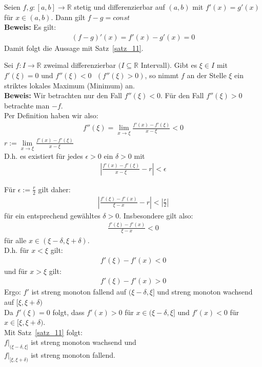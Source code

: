\begin{Korollar}{
	Seien $f,g : [a,b] \rightarrow \mathbb{R}$ stetig und differenzierbar auf
	$(a,b)$ mit $f'(x) = g'(x)$ für $x \in (a,b)$. Dann gilt $f-g = const$\\
	\textbf{Beweis:} Es gilt: 
	\begin{align*}
		(f-g)'(x) = f'(x)-g'(x) = 0
	\end{align*}
	Damit folgt die Aussage mit Satz~\ref{satz_11}.
}\end{Korollar}

\begin{Satz}{
	Sei $f: I \rightarrow \mathbb{R}$ zweimal differenzierbar $(I \subseteq 
	\mathbb{R}$ Intervall$)$. Gibt es $\xi \in I$ mit $f'(\xi) = 0$ und 
	$f''(\xi) < 0 \textbf{ }  (f''(\xi)> 0)$, so nimmt $f$ an der Stelle $\xi$ ein 
	striktes lokales Maximum (Minimum) an.\\
	\textbf{Beweis:} Wir betrachten nur den Fall $f''(\xi) < 0$. Für den Fall
	$f''(\xi) > 0$ betrachte man $-f$.\\
	Per Definition haben wir also: 
	\begin{align*}
		f''(\xi) = \lim\limits_{x \rightarrow \xi}{\frac{f'(x) - f'(\xi)}{x - \xi} }
		< 0
	\end{align*}
	$r := \lim\limits_{x \rightarrow \xi}{\frac{f'(x) - f'(\xi)}{x - \xi} } $ \\
	D.h. es existiert für jedes $ \epsilon > 0$ ein $\delta > 0$ mit
	\begin{align*}
		\left\vert \frac{f'(x) - f'(\xi)}{x - \xi} - r \right\vert < \epsilon
	\end{align*}
	
	Für $\epsilon := \frac{r}{2}$ gilt daher: 
	\begin{align*}
		\left\vert \frac{f'(\xi) - f'(x)}{\xi - x}-r \right\vert < \left\vert \frac{r}{2} \right\vert
	\end{align*}
	für ein entsprechend gewähltes $\delta > 0$. Insbesondere gilt also:
	\begin{align*}
		\frac{f'(\xi)-f'(x)}{\xi - x} < 0
	\end{align*}
	für alle $ x \in ( \xi - \delta, \xi + \delta)$.\\
	D.h. für $x < \xi$ gilt: 
	\begin{align*}
		f'(\xi) - f'(x) < 0
	\end{align*}
	und für $ x > \xi$ gilt: 
	\begin{align*}
		f'(\xi) - f'(x) > 0
	\end{align*}
	Ergo: $f'$ ist streng monoton fallend auf $(\xi - \delta, \xi]$ und 
	streng monoton wachsend auf $[ \xi, \xi + \delta)$ \\
	Da $f'(\xi) = 0$ folgt, dass $f'(x) > 0$ für $x \in (\xi-\delta, \xi]$
	und $f'(x) <0 $ für $x \in [\xi, \xi + \delta)$.\\
	  Mit Satz~\ref{satz_11} folgt: \\
	  	\hspace*{5mm}$f|_{(\xi-\delta, \xi]}$ ist streng monoton wachsend und \\
	  	\hspace*{5mm}$f|_{[\xi, \xi + \delta)}$ ist streng monoton fallend.
}\end{Satz}

